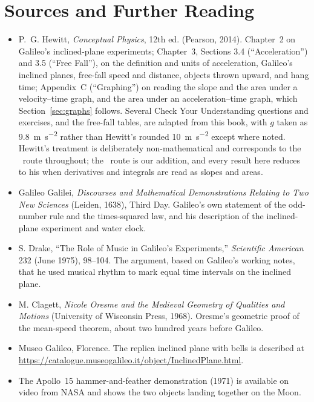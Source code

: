 \documentclass[11pt,twoside,openany]{book}
\newcommand{\viewtag}[3]{\fcolorbox{#2}{#3}{\footnotesize\textbf{\textcolor{#2}{#1}}}}
\newcommand{\elemtag}{\viewtag{Elementary}{elemcol}{elempale}}
\newcommand{\calctag}{\viewtag{Calculus}{calccol}{calcpale}}
\begin{document}
\section*{Sources and Further Reading}
\begin{itemize}[itemsep=3pt]
  \item P.~G. Hewitt, \emph{Conceptual Physics}, 12th ed. (Pearson, 2014). Chapter~2 on Galileo's inclined-plane experiments; Chapter~3, Sections 3.4 (``Acceleration'') and 3.5 (``Free Fall''), on the definition and units of acceleration, Galileo's inclined planes, free-fall speed and distance, objects thrown upward, and hang time; Appendix~C (``Graphing'') on reading the slope and the area under a velocity--time graph, and the area under an acceleration--time graph, which Section~\ref{sec:graphs} follows. Several Check Your Understanding questions and exercises, and the free-fall tables, are adapted from this book, with $g$ taken as \SI{9.8}{\metre\per\second\squared} rather than Hewitt's rounded \SI{10}{\metre\per\second\squared} except where noted. Hewitt's treatment is deliberately non-mathematical and corresponds to the \elemtag\ route throughout; the \calctag\ route is our addition, and every result here reduces to his when derivatives and integrals are read as slopes and areas.
  \item Galileo Galilei, \emph{Discourses and Mathematical Demonstrations Relating to Two New Sciences} (Leiden, 1638), Third Day. Galileo's own statement of the odd-number rule and the times-squared law, and his description of the inclined-plane experiment and water clock.
  \item S. Drake, ``The Role of Music in Galileo's Experiments,'' \emph{Scientific American} 232 (June 1975), 98--104. The argument, based on Galileo's working notes, that he used musical rhythm to mark equal time intervals on the inclined plane.
  \item M. Clagett, \emph{Nicole Oresme and the Medieval Geometry of Qualities and Motions} (University of Wisconsin Press, 1968). Oresme's geometric proof of the mean-speed theorem, about two hundred years before Galileo.
  \item Museo Galileo, Florence. The replica inclined plane with bells is described at \url{https://catalogue.museogalileo.it/object/InclinedPlane.html}.
  \item The Apollo~15 hammer-and-feather demonstration (1971) is available on video from NASA and shows the two objects landing together on the Moon.
\end{itemize}
\end{document}
